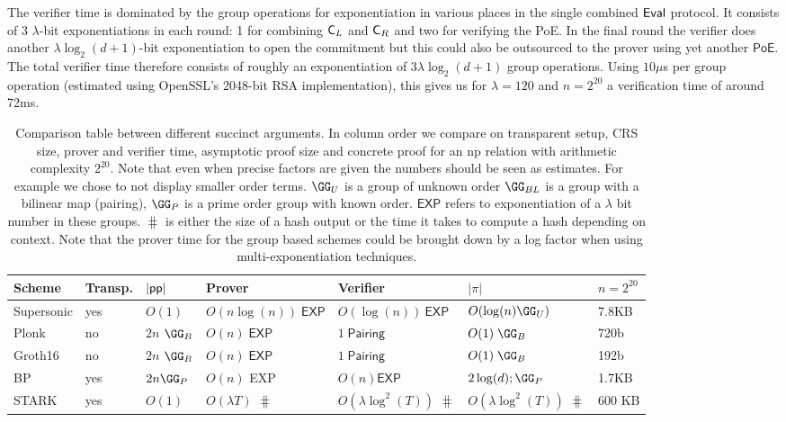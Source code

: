 The verifier time is dominated by the group operations for exponentiation in various places in the single combined $\textsf{{Eval}}$ protocol. It consists of 3 $\lambda$-bit exponentiations in each round: 1 for combining $\mathsf{C}_L$ and $\mathsf{C}_R$ and two for verifying the \textsf{PoE}. In the final round the verifier does another $\lambda \log_2(d+1)$-bit exponentiation to open the commitment but this could also be outsourced to the prover using yet another $\textsf{PoE}$. The total verifier time therefore consists of roughly an exponentiation of $3 \lambda \log_2(d+1)$ group operations. 
Using $10\mu$s per group operation (estimated using OpenSSL's 2048-bit RSA implementation), this gives us for $\lambda=120$ and $n=2^{20}$ a verification time of around 72ms. 
\begin{table}[!htp]
\begin{small}
\begin{tabular}{l||l|l|l|l|l|l}
	Scheme & Transp. & $|\textsf{pp}|$  & Prover & Verifier & $|\pi|$& $n=2^{20}$ \\
	\hline
	\hline
    Supersonic & yes & $O(1)$ & $O( n \log(n) )\; \textsf{EXP}$ & $O(\log(n))~\textsf{EXP}$ & $O(\log(n) \GG_{U})$ & 7.8KB \\
    Plonk \cite{Plonk} & no & $2n$ $\GG_{B}$ & $O(n)\; \textsf{EXP}$  & $1\; \textsf{Pairing} $ & $O(1)\; \GG_{B}$ & 720b \\
        Groth16 \cite{EC:Groth16} & no & $2n$ $\GG_{B}$ & $O(n)\; \textsf{EXP}$  & $1\; \textsf{Pairing} $ & $O(1)\; \GG_{B}$ & 192b \\
       BP \cite{SP:BBBPWM18} & yes &$2 n \GG_{P}$& $O(n)$ \textsf{EXP}& $O(n)\textsf{EXP}$ &$2 \log(d) ; \GG_P$ & 1.7KB\\
       STARK & yes & $O(1)$ & $O(\lambda  T)$ $\hash$ & $O(\lambda \log^2(T))$ $\hash$ & $O(\lambda \log^2(T))$ $\hash$ & 600 KB
\end{tabular}

\caption{Comparison table between different succinct arguments. 
In column order we compare on transparent setup, CRS size, prover and verifier time, asymptotic proof size and concrete proof for an np relation with arithmetic complexity $2^{20}$.
Note that even when precise factors are given the numbers should be seen as  estimates. For example we chose to not display smaller order terms. $\GG_U$ is a group of unknown order $\GG_{BL}$ is a group with a bilinear map (pairing), $\GG_{P}$ is a prime order group with known order. $\textsf{EXP}$ refers to exponentiation of a $\lambda$ bit number in these groups. $\hash$ is either the size of a hash output or the time it takes to compute a hash depending on context. 
Note that the prover time for the group based schemes could be brought down by a log factor when using multi-exponentiation techniques.}
\label{tab:polycommit}
\end{small}
\end{table}

